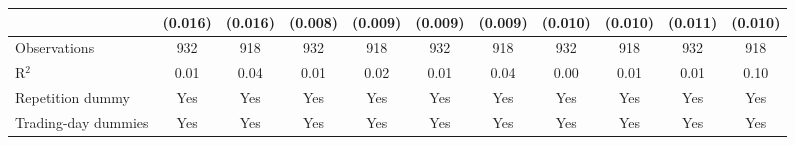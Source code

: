 \begin{tabular}{lcccccccccc}
                       & (0.016)       & (0.016)        & (0.008)       & (0.009)       & (0.009)       & (0.009)        & (0.010)       & (0.010)       & (0.011)       & (0.010)\\   
   \midrule
   Observations        & 932           & 918            & 932           & 918           & 932           & 918            & 932           & 918           & 932           & 918\\  
   R$^2$               & 0.01          & 0.04           & 0.01          & 0.02          & 0.01          & 0.04           & 0.00          & 0.01          & 0.01          & 0.10\\  
   Repetition dummy    & Yes           & Yes            & Yes           & Yes           & Yes           & Yes            & Yes           & Yes           & Yes           & Yes\\  
   Trading-day dummies & Yes           & Yes            & Yes           & Yes           & Yes           & Yes            & Yes           & Yes           & Yes           & Yes\\  
   \midrule \midrule
\end{tabular}
